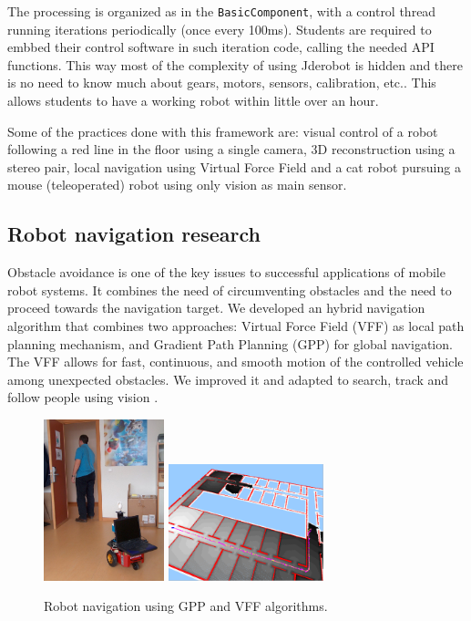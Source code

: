\documentclass[twocolumn]{svjour3}          %
\begin{document}
The processing is organized as in the \texttt{BasicComponent}, with a control thread running iterations periodically (once every 100ms). Students are required to embbed their control software in such iteration code, calling the needed API functions. This way most of the complexity of using Jderobot is hidden and there is no need to know much about gears, motors, sensors, calibration, etc.. This allows students to have a working robot within little over an hour. 

Some of the practices done with this framework are: visual control of a robot following a red line in the floor using a single camera, 3D reconstruction using a stereo pair, local navigation using Virtual Force Field and a cat robot pursuing a mouse (teleoperated) robot using only vision as main sensor.

\subsection{Robot navigation research}

Obstacle avoidance is one of the key issues to successful applications of mobile robot systems. It combines the need of circumventing obstacles and the need to proceed towards the navigation target. We developed an hybrid navigation algorithm that combines two approaches: Virtual Force Field (VFF) as local path planning mechanism, and Gradient Path Planning (GPP) for global navigation. The VFF allows for fast, continuous, and smooth motion of the controlled vehicle among unexpected obstacles. We improved it and adapted to search, track and follow people using vision \cite{canas05d}. 

\begin{figure}[h!]
  \includegraphics[width=3.5cm]{figs/moriles_sigue_persona.jpg}
 \includegraphics[width=4.5cm]{figs/gppNav.png}
\caption{Robot navigation using GPP and VFF algorithms.}
\label{fig:gppNav}
\end{figure}
\end{document}
